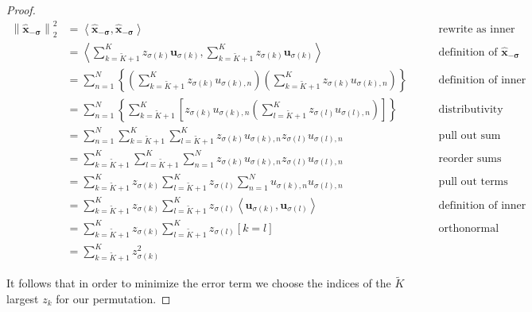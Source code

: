 \documentclass{scrartcl}
\newcommand{\norm}[1]{\left\lVert#1\right\rVert}
\newcommand{\iprod}[1]{\left\langle#1\right\rangle}
\begin{document}
\begin{proof}
      \begin{align*}
        \norm{\mathbf{\hat{x}_{-\sigma}}}_2^2
          &= \iprod{\mathbf{\hat{x}_{-\sigma}}, \mathbf{\hat{x}_{-\sigma}}}
          & \qquad\text{rewrite as inner product}\\
          &= \iprod{
               \sum_{k=\tilde{K}+1}^K z_{\sigma(k)}\mathbf{u}_{\sigma(k)},
               \sum_{k=\tilde{K}+1}^K z_{\sigma(k)}\mathbf{u}_{\sigma(k)}
             }
          & \qquad\text{definition of $\mathbf{\hat{x}_{-\sigma}}$}\\
          &= \sum_{n=1}^N
               \left\{
                 \left(
                  \sum_{k=\tilde{K}+1}^K z_{\sigma(k)}u_{\sigma(k),n}
                 \right)
                 \left(
                  \sum_{k=\tilde{K}+1}^K z_{\sigma(k)}u_{\sigma(k),n}
                 \right)
               \right\}
          & \qquad\text{definition of inner product}\\
          &= \sum_{n=1}^N
               \left\{
                  \sum_{k=\tilde{K}+1}^K
                \left[
                  z_{\sigma(k)}u_{\sigma(k),n}
                 \left(
                  \sum_{l=\tilde{K}+1}^K z_{\sigma(l)}u_{\sigma(l),n}
                 \right)
               \right]
               \right\}
          & \qquad\text{distributivity}\\
          &= \sum_{n=1}^N
               \sum_{k=\tilde{K}+1}^K
                 \sum_{l=\tilde{K}+1}^K
                   z_{\sigma(k)}u_{\sigma(k),n} z_{\sigma(l)}u_{\sigma(l),n}
          & \qquad\text{pull out sum}\\
          &= \sum_{k=\tilde{K}+1}^K
               \sum_{l=\tilde{K}+1}^K
                 \sum_{n=1}^N
                   z_{\sigma(k)}u_{\sigma(k),n} z_{\sigma(l)}u_{\sigma(l),n}
          & \qquad\text{reorder sums}\\
          &= \sum_{k=\tilde{K}+1}^K
                z_{\sigma(k)}
               \sum_{l=\tilde{K}+1}^K
                z_{\sigma(l)}
                 \sum_{n=1}^N
                   u_{\sigma(k),n} u_{\sigma(l),n}
          & \qquad\text{pull out terms}\\
          &= \sum_{k=\tilde{K}+1}^K
                z_{\sigma(k)}
               \sum_{l=\tilde{K}+1}^K
                z_{\sigma(l)}
                 \iprod{\mathbf{u}_{\sigma(k)}, \mathbf{u}_{\sigma(l)}}
          & \qquad\text{definition of inner product}\\
          &= \sum_{k=\tilde{K}+1}^K
                z_{\sigma(k)}
               \sum_{l=\tilde{K}+1}^K
                z_{\sigma(l)} [k = l]
          & \qquad\text{orthonormal}\\
          &= \sum_{k=\tilde{K}+1}^K z_{\sigma(k)}^2
      \end{align*}

      It follows that in order to minimize the error term we choose the indices
      of the $\tilde{K}$ largest $z_k$ for our permutation.
    \end{proof}
\end{document}
